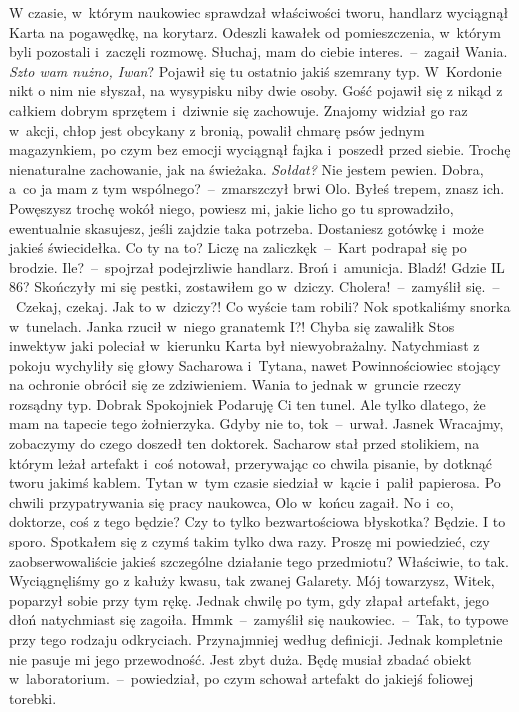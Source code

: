 \documentclass[../MAIN.tex]{subfiles}
\begin{document}
W czasie, w~którym naukowiec sprawdzał właściwości tworu, handlarz wyciągnął Karta na pogawędkę, na korytarz. Odeszli kawałek od pomieszczenia, w~którym byli pozostali i~zaczęli rozmowę.
\sx Słuchaj, mam do ciebie interes.~--~zagaił Wania.
\xx \textit{Szto wam nużno, Iwan}?
\xx Pojawił się tu ostatnio jakiś szemrany typ. W~Kordonie nikt o nim nie słyszał, na wysypisku niby dwie osoby. Gość pojawił się z nikąd z całkiem dobrym sprzętem i~dziwnie się zachowuje. Znajomy widział go raz w~akcji, chłop jest obcykany z bronią, powalił chmarę psów jednym magazynkiem, po czym bez emocji wyciągnął fajka i~poszedł przed siebie. Trochę nienaturalne zachowanie, jak na świeżaka.
\xx \textit{Sołdat?}
\xx Nie jestem pewien.
\xx Dobra, a~co ja mam z tym wspólnego?~--~zmarszczył brwi Olo.
\xx Byłeś trepem, znasz ich. Powęszysz trochę wokół niego, powiesz mi, jakie licho go tu sprowadziło, ewentualnie skasujesz, jeśli zajdzie taka potrzeba. Dostaniesz gotówkę i~może jakieś świecidełka. Co ty na to?
\xx Liczę na zaliczkę\3k~--~Kart podrapał się po brodzie.
\xx Ile?~--~spojrzał podejrzliwie handlarz.
\xx Broń i~amunicja.
\xx Bladź! Gdzie IL 86?
\xx Skończyły mi się pestki, zostawiłem go w~dziczy.
\xx Cholera!~--~zamyślił się.~--~Czekaj, czekaj. Jak to w~dziczy?! Co wyście tam robili?
\xx No\3k spotkaliśmy snorka w~tunelach. Janka rzucił w~niego granatem\3k
\xx I?!
\xx Chyba się zawalił\3k
\qm
Stos inwektyw jaki poleciał w~kierunku Karta był niewyobrażalny. Natychmiast z pokoju wychyliły się głowy Sacharowa i~Tytana, nawet Powinnościowiec stojący na ochronie obrócił się ze zdziwieniem. Wania to jednak w~gruncie rzeczy rozsądny typ.
\sx Dobra\3k Spokojnie\3k Podaruję Ci ten tunel. Ale tylko dlatego, że mam na tapecie tego żołnierzyka. Gdyby nie to, to\3k~--~urwał.
\xx Jasne\3k
\xx Wracajmy, zobaczymy do czego doszedł ten doktorek.
\qm
Sacharow stał przed stolikiem, na którym leżał artefakt i~coś notował, przerywając co chwila pisanie, by dotknąć tworu jakimś kablem. Tytan w~tym czasie siedział w~kącie i~palił papierosa. Po chwili przypatrywania się pracy naukowca, Olo w~końcu zagaił.
\sx No i~co, doktorze, coś z tego będzie? Czy to tylko bezwartościowa błyskotka?
\xx Będzie. I to sporo. Spotkałem się z czymś takim tylko dwa razy. Proszę mi powiedzieć, czy zaobserwowaliście jakieś szczególne działanie tego przedmiotu?
\xx Właściwie, to tak. Wyciągnęliśmy go z kałuży kwasu, tak zwanej Galarety. Mój towarzysz, Witek, poparzył sobie przy tym rękę. Jednak chwilę po tym, gdy złapał artefakt, jego dłoń natychmiast się zagoiła.
\xx Hmm\3k~--~zamyślił się naukowiec.~--~Tak, to typowe przy tego rodzaju odkryciach. Przynajmniej według definicji. Jednak kompletnie nie pasuje mi jego przewodność. Jest zbyt duża. Będę musiał zbadać obiekt w~laboratorium.~--~powiedział, po czym schował artefakt do jakiejś foliowej torebki.
\end{document}
